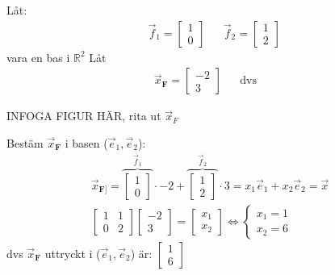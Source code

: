 \begin{Ex}
	Låt:
	\begin{align*}
	&\vec{f}_1 = \begin{bmatrix} 1\\0 \end{bmatrix}
	&&\vec{f}_2 = \begin{bmatrix} 1\\2 \end{bmatrix}
	\end{align*}
	vara en bas i $\mathbb{R}^2$
	Låt 
	\begin{align*}
	&\vec{x}_\mathbf{F} = \begin{bmatrix} -2\\3 \end{bmatrix}
	&&\mbox{dvs}
	&&
	\end{align*}
	\begin{center}
		INFOGA FIGUR HÄR, rita ut $\vec{x}_F$
	\end{center}
	Bestäm $\vec{x}_\mathbf{F}$ i basen ($\vec{e}_1, \vec{e}_2$):
	\begin{gather*}
		\vec{x}_\mathbf{F]} = 
		\overbrace{\begin{bmatrix} 1\\0 \end{bmatrix}}^{\vec{f}_1} \cdot -2 + 
		\overbrace{\begin{bmatrix} 1\\2 \end{bmatrix}}^{\vec{f}_2} 
		\cdot 3 = x_1 \vec{e}_1 + x_2 \vec{e}_2 = \vec{x}\\
		\begin{bmatrix} 1&1\\0&2 \end{bmatrix} \begin{bmatrix} -2\\3 \end{bmatrix} = \begin{bmatrix} x_1\\x_2 \end{bmatrix} 
		\Leftrightarrow 
		\begin{cases}
			x_1 = 1\\
			x_2 = 6
		\end{cases}
	\end{gather*}
	dvs $\vec{x}_\mathbf{F}$ uttryckt i ($\vec{e}_1, \vec{e}_2$) är: $\begin{bmatrix} 1\\6 \end{bmatrix}$\\

\end{Ex}
